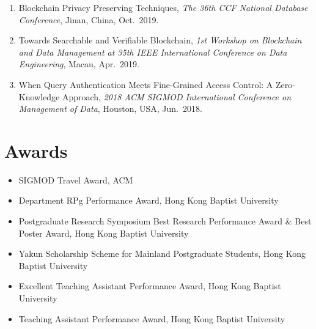 \documentclass{mycv}
\begin{document}
\begin{enumerate}
  \item Blockchain Privacy Preserving Techniques, \emph{The 36th CCF National Database Conference}, Jinan, China, Oct.~2019.
  \item Towards Searchable and Verifiable Blockchain, \emph{1st Workshop on Blockchain and Data Management at 35th IEEE International Conference on Data Engineering}, Macau, Apr.~2019.
  \item When Query Authentication Meets Fine-Grained Access Control: A Zero-Knowledge Approach, \emph{2018 ACM SIGMOD International Conference on Management of Data}, Houston, USA, Jun.~2018.
\end{enumerate}

\section{Awards}

\begin{itemize}
  \item SIGMOD Travel Award, ACM 
  \item Department RPg Performance Award, Hong Kong Baptist University 
  \item Postgraduate Research Symposium Best Research Performance Award \& Best Poster Award, Hong Kong Baptist University 
  \item Yakun Scholarship Scheme for Mainland Postgraduate Students, Hong Kong Baptist University 
  \item Excellent Teaching Assistant Performance Award, Hong Kong Baptist University 
  \item Teaching Assistant Performance Award, Hong Kong Baptist University 
\end{itemize}
\end{document}
